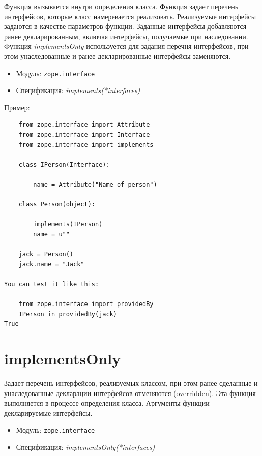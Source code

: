 \documentclass[a4paper,openany,twoside,final]{book}
\providecommand*{\DUroletitlereference}[1]{\textsl{#1}}
\begin{document}
Функция вызывается внутри определения класса.  Функция задает перечень интерфейсов, которые класс намеревается реализовать.  Реализуемые интерфейсы задаются в качестве параметров функции.  Заданные интерфейсы добавляются ранее декларированным, включая интерфейсы, получаемые при наследовании.  Функция \DUroletitlereference{implementsOnly} используется для задания перечня интерфейсов, при этом унаследованные и ранее декларированные интерфейсы заменяются.

\begin{itemize}

\item Модуль: \texttt{zope.interface}

\item Спецификация: \DUroletitlereference{implements(*interfaces)}

\end{itemize}

Пример:

\begin{verbatim}
    from zope.interface import Attribute
    from zope.interface import Interface
    from zope.interface import implements

    class IPerson(Interface):

        name = Attribute("Name of person")

    class Person(object):

        implements(IPerson)
        name = u""

    jack = Person()
    jack.name = "Jack"

You can test it like this:

    from zope.interface import providedBy
    IPerson in providedBy(jack)
True
\end{verbatim}


\section*{implementsOnly%
  \label{implementsonly}%
}

Задает перечень интерфейсов, реализуемых классом, при этом ранее сделанные и унаследованные декларации интерфейсов отменяются (overridden).  Эта функция выполняется в процессе определения класса.  Аргументы функции~-- декларируемые интерфейсы.

\begin{itemize}

\item Модуль: \texttt{zope.interface}

\item Спецификация: \DUroletitlereference{implementsOnly(*interfaces)}

\end{itemize}
\end{document}
